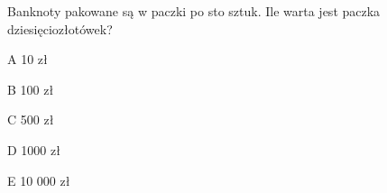 \begin{tresc}
Banknoty pakowane są w paczki po sto sztuk. Ile warta jest paczka dziesięciozłotówek?
\end{tresc}
\begin{wariant}{A} 10 zł \end{wariant}
\begin{wariant}{B} 100 zł \end{wariant}
\begin{wariant}{C} 500 zł \end{wariant}
\begin{wariant}{D} 1000 zł \end{wariant}
\begin{wariant}{E} 10 000 zł \end{wariant}
